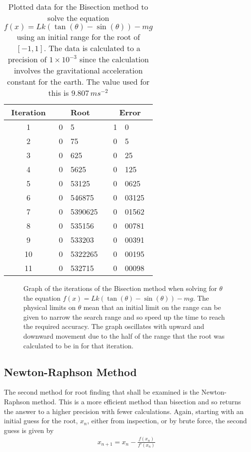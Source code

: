 \documentclass[11pt]{article} %
\newcommand{\inputTikZ}[1]{%
  }
\newcommand{\inputTikZ}[1]{%
    \beginpgfgraphicnamed{#1-external}%
    \endpgfgraphicnamed%
  }
\begin{document}
	\begin{table}[h!]
		\centering
		\begin{tabular}{c|r@{.}l|r@{.}l}
			Iteration &\multicolumn{2}{c}{Root} &\multicolumn{2}{|c}{Error} \\ \hline \hline
			1	&0&5	&1&0\\
			2	&0&75	&0&5\\
			3	&0&625	&0&25\\
			4	&0&5625	&0&125\\
			5	&0&53125	&0&0625\\
			6	&0&546875	&0&03125\\
			7	&0&5390625	&0&01562\\
			8	&0&535156	&0&00781\\
			9	&0&533203	&0&00391\\
			10	&0&5322265	&0&00195\\
			11	&0&532715	&0&00098\\
		\end{tabular}
		\caption{Plotted data for the Bisection method to solve the equation $f(x) = Lk(\tan(\theta) - \sin(\theta)) - mg$ using an initial range for the root of $[-1,1]$. The data is calculated to a precision of $1\times10^{-3}$ since the calculation involves the gravitational acceleration constant for the earth. The value used for this is $9.807\,ms^{-2}$}
		\label{tab:prob1data}
	\end{table}

	\begin{figure}[h!]
		\centering
			\inputTikZ{bisection1}
		\caption{\label{fig:bisection1}Graph of the iterations of the Bisection method when solving for $\theta$ the equation $f(x) = Lk(\tan(\theta) - \sin(\theta)) - mg$. The physical limits on $\theta$ mean that an initial limit on the range can be given to narrow the search range and so speed up the time to reach the required accuracy. The graph oscillates with upward and downward movement due to the half of the range that the root was calculated to be in for that iteration.}
	\end{figure}

	\subsection{Newton-Raphson Method}
	The second method for root finding that shall be examined is the Newton-Raphson method. This is a more efficient method than bisection and so returns the answer to a higher precision with fewer calculations. Again, starting with an initial guess for the root, $x_n$, either from inspection, or by brute force, the second guess is given by
	\begin{align*}
		x_{n+1} = x_n - \frac{f(x_n)}{f'(x_n)}
	\end{align*}
	
\end{document}
